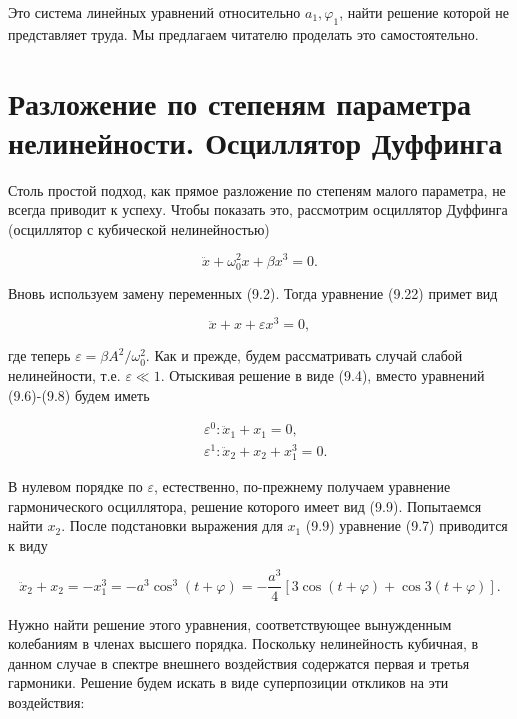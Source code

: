\documentclass[10pt]{article}
\begin{document}
Это система линейных уравнений относительно $a_{1}, \varphi_{1}$, найти решение которой не представляет труда. Мы предлагаем читателю проделать это самостоятельно.

\section*{Разложение по степеням параметра нелинейности. Осциллятор Дуффинга}
Столь простой подход, как прямое разложение по степеням малого параметра, не всегда приводит к успеху. Чтобы показать это, рассмотрим осциллятор Дуффинга (осциллятор с кубической нелинейностью)


\begin{equation*}
\ddot{x}+\omega_{0}^{2} x+\beta x^{3}=0 . \tag{9.22}
\end{equation*}


Вновь используем замену переменных (9.2). Тогда уравнение (9.22) примет вид


\begin{equation*}
\ddot{x}+x+\varepsilon x^{3}=0, \tag{9.23}
\end{equation*}


где теперь $\varepsilon=\beta A^{2} / \omega_{0}^{2}$. Как и прежде, будем рассматривать случай слабой нелинейности, т.е. $\varepsilon \ll 1$. Отыскивая решение в виде (9.4), вместо уравнений (9.6)-(9.8) будем иметь


\begin{align*}
& \varepsilon^{0}: \ddot{x}_{1}+x_{1}=0,  \tag{9.24}\\
& \varepsilon^{1}: \ddot{x}_{2}+x_{2}+x_{1}^{3}=0 . \tag{9.25}
\end{align*}


В нулевом порядке по $\varepsilon$, естественно, по-прежнему получаем уравнение гармонического осциллятора, решение которого имеет вид (9.9). Попытаемся найти $x_{2}$. После подстановки выражения для $x_{1}$ (9.9) уравнение (9.7) приводится к виду


\begin{equation*}
\ddot{x}_{2}+x_{2}=-x_{1}^{3}=-a^{3} \cos ^{3}(t+\varphi)=-\frac{a^{3}}{4}[3 \cos (t+\varphi)+\cos 3(t+\varphi)] . \tag{9.26}
\end{equation*}


Нужно найти решение этого уравнения, соответствующее вынужденным колебаниям в членах высшего порядка. Поскольку нелинейность кубичная, в данном случае в спектре внешнего воздействия содержатся первая и третья гармоники. Решение будем искать в виде суперпозиции откликов на эти воздействия:
\end{document}
